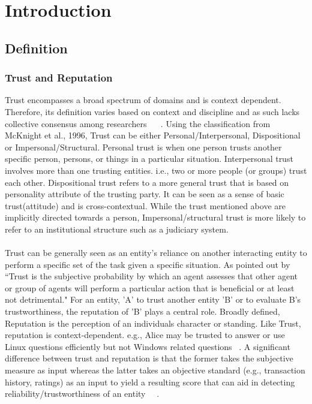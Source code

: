 \chapter{Introduction} \label{ch:intro}

\section{Definition}
\subsection{Trust and Reputation}
Trust encompasses a broad spectrum of domains and is context dependent.
Therefore, its definition varies based on context and discipline and as such
lacks collective consensus among researchers ~\cite{mcknight1996meanings} 
~\cite{mcknight2001trust}.
Using the classification from McKnight et al., 1996, Trust can be either
Personal/Interpersonal, Dispositional or Impersonal/Structural.
Personal trust is when one person trusts another specific person, persons, or
things in a particular situation. Interpersonal trust involves more than one
trusting entities. i.e., two or more people (or groups) trust each other.
Dispositional trust refers to a more general trust that is based on personality
attribute of the trusting party. It can be seen as a sense of basic
trust(attitude) and is cross-contextual. While the trust mentioned above are
implicitly directed towards a person, Impersonal/structural trust is more
likely to refer to an institutional structure such as a judiciary system.\\\\ 
Trust can be generally seen as an entity's reliance on another interacting
entity to perform a specific set of the task given a specific situation.  As
pointed out by ~\cite{gambetta2000can} ``Trust is the subjective probability by
which an agent assesses that other agent or group of agents will perform a
particular action that is beneficial or at least not detrimental."
For an entity, 'A' to trust another entity 'B' or to evaluate B's
trustworthiness, the reputation of 'B' plays a central role. Broadly defined,
Reputation is the perception of an individuals character or standing. Like
Trust, reputation is context-dependent. e.g., Alice may be trusted to 
answer or use Linux questions efficiently but not Windows related questions
~\cite{zacharia2000collaborative}.
A significant difference between trust and
reputation is that the former takes the subjective measure as input whereas the
latter takes an objective standard (e.g., transaction history, ratings) as an
input to yield a resulting score that can aid in detecting
reliability/trustworthiness of an entity~\cite{Sabater2005} ~\cite{castelfranchi2000trust}. \\


